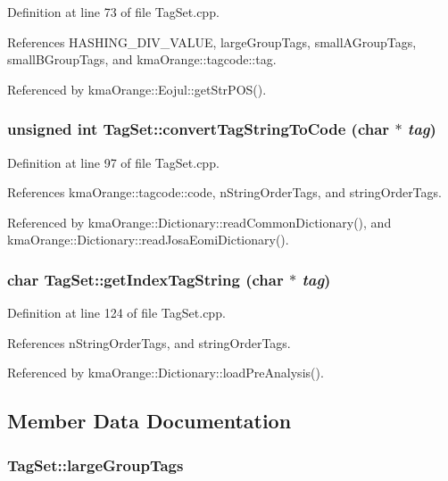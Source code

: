 Definition at line 73 of file TagSet.cpp.

References HASHING\_\-DIV\_\-VALUE, largeGroupTags, smallAGroupTags, smallBGroupTags, and kmaOrange::tagcode::tag.

Referenced by kmaOrange::Eojul::getStrPOS().\hypertarget{classkmaOrange_1_1TagSet_0d5649071e5a2b636b75b67ed19a0c11}{
\subsubsection[{convertTagStringToCode}]{\setlength{\rightskip}{0pt plus 5cm}unsigned int TagSet::convertTagStringToCode (char $\ast$ {\em tag})}}
\label{classkmaOrange_1_1TagSet_0d5649071e5a2b636b75b67ed19a0c11}




Definition at line 97 of file TagSet.cpp.

References kmaOrange::tagcode::code, nStringOrderTags, and stringOrderTags.

Referenced by kmaOrange::Dictionary::readCommonDictionary(), and kmaOrange::Dictionary::readJosaEomiDictionary().\hypertarget{classkmaOrange_1_1TagSet_9e1b857c9730694ee2a9c56402ba73d6}{
\subsubsection[{getIndexTagString}]{\setlength{\rightskip}{0pt plus 5cm}char TagSet::getIndexTagString (char $\ast$ {\em tag})}}
\label{classkmaOrange_1_1TagSet_9e1b857c9730694ee2a9c56402ba73d6}




Definition at line 124 of file TagSet.cpp.

References nStringOrderTags, and stringOrderTags.

Referenced by kmaOrange::Dictionary::loadPreAnalysis().

\subsection{Member Data Documentation}
\hypertarget{classkmaOrange_1_1TagSet_6a4cec112f4e44e88eb4f472add2ffbc}{
\subsubsection[{largeGroupTags}]{ {\bf TagSet::largeGroupTags}}}
\label{classkmaOrange_1_1TagSet_6a4cec112f4e44e88eb4f472add2ffbc}


